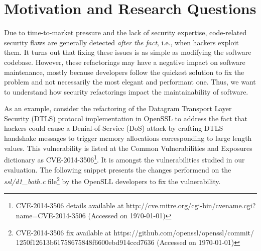 \documentclass[10pt,conference]{IEEEtran}
\begin{document}
\section{Motivation and Research Questions}\label{sec:motivation}
%
Due to time-to-market pressure and the lack of security expertise, code-related
security flaws are generally detected \textit{after the fact}, i.e., when
hackers exploit them. It turns out that fixing these issues is as simple as
modifying the software codebase. However, these refactorings may have a negative
impact on software maintenance, mostly because developers follow the quickest
solution to fix the problem and not necessarily the most elegant and performant
one. Thus, we want to understand how security refactorings impact the
maintainability of software.

As an example, consider the refactoring of the Datagram Transport Layer Security
(DTLS) protocol implementation in OpenSSL to address the fact that hackers could
cause a Denial-of-Service (DoS) attack by crafting DTLS
handshake messages to trigger memory allocations corresponding to large length
values. This vulnerability is listed at the Common Vulnerabilities and Exposures
dictionary as CVE-2014-3506\footnote{CVE-2014-3506 details available at
http://cve.mitre.org/cgi-bin/cvename.cgi?name=CVE-2014-3506 (Accessed on
\today{})}. It is amongst the vulnerabilities studied in our evaluation.
The following snippet presents the changes performend on the
\emph{ssl/d1\_both.c} file\footnote{CVE-2014-3506 fix available  at
https://github.com/openssl/openssl/commit/\\1250f12613b61758675848f6600ebd914ccd7636
(Accessed on \today{})} by the OpenSLL developers to fix the vulnerability.
\end{document}
